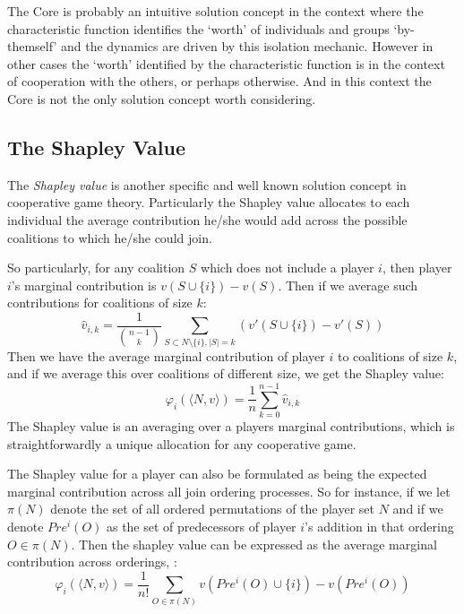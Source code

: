 The Core is probably an intuitive solution concept in the context where the characteristic function identifies the `worth' of individuals and groups `by-themself' and the dynamics are driven by this isolation mechanic.
However in other cases the `worth' identified by the characteristic function is in the context of cooperation with the others, or perhaps otherwise.
And in this context the Core is not the only solution concept worth considering.

\subsection{The Shapley Value}\label{subsec:the_shapley_value}

The \textit{Shapley value} is another specific and well known solution concept in cooperative game theory.
Particularly the Shapley value allocates to each individual the average contribution he/she would add across the possible coalitions to which he/she could join.

So particularly, for any coalition $S$ which does not include a player $i$, then player $i$'s marginal contribution is $v(S\cup\{i\}) - v(S)$. Then if we average such contributions for coalitions of size $k$:
\begin{equation}\label{eq:shapley_value2}
\hat{v}_{i,k} = \frac{1}{\binom{n-1}{k}}\sum_{S\subset N\setminus \{ i\} , |S|=k} %
(v'(S\cup\{i\})-v'(S))
\end{equation}
Then we have the average marginal contribution of player $i$ to coalitions of size $k$, and if we average this over coalitions of different size, we get the Shapley value:
\begin{equation}\label{shap2} \varphi_i(\langle N,v\rangle) = \frac{1}{n}\sum_{k=0}^{n-1}\hat{v}_{i,k} \end{equation}
The Shapley value is an averaging over a players marginal contributions, which is straightforwardly a unique allocation for any cooperative game.

The Shapley value for a player can also be formulated as being the expected marginal contribution across all join ordering processes.
So for instance, if we let $\pi(N)$ denote the set of all ordered permutations of the player set $N$ and if we denote $Pre^i(O)$ as the set of predecessors of player $i$'s addition in that ordering $O\in \pi(N)$. Then the shapley value can be expressed as the average marginal contribution across orderings, \cite{weber_1988}:
\begin{equation}\label{shapley_value3}
    \varphi_i(\langle N,v\rangle) = \frac{1}{n!}\sum_{O\in\pi(N)}v(Pre^i(O)\cup\{i\})-v(Pre^i(O))
\end{equation}

